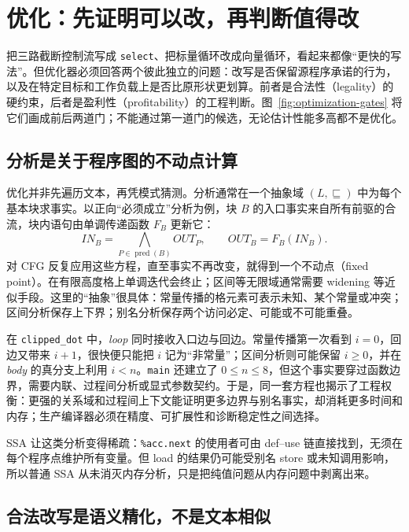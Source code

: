 \section{优化：先证明可以改，再判断值得改}
\label{sec:optimization}

把三路截断控制流写成 \texttt{select}、把标量循环改成向量循环，看起来都像“更快的写法”。但优化器必须回答两个彼此独立的问题：改写是否保留源程序承诺的行为，以及在特定目标和工作负载上是否比原形状更划算。前者是合法性（legality）的硬约束，后者是盈利性（profitability）的工程判断。图~\ref{fig:optimization-gates} 将它们画成前后两道门；不能通过第一道门的候选，无论估计性能多高都不是优化。



\subsection{分析是关于程序图的不动点计算}

优化并非先遍历文本，再凭模式猜测。分析通常在一个抽象域 \((L,\sqsubseteq)\) 中为每个基本块求事实。以正向“必须成立”分析为例，块 \(B\) 的入口事实来自所有前驱的合流，块内语句由单调传递函数 \(F_B\) 更新它：
\begin{equation}
  IN_B=\bigwedge_{P\in \operatorname{pred}(B)}OUT_P,
  \qquad OUT_B=F_B(IN_B).
  \label{eq:dataflow-fixed-point}
\end{equation}
对 CFG 反复应用这些方程，直至事实不再改变，就得到一个不动点（fixed point）。在有限高度格上单调迭代会终止；区间等无限域通常需要 widening 等近似手段。这里的“抽象”很具体：常量传播的格元素可表示未知、某个常量或冲突；区间分析保存上下界；别名分析保存两个访问必定、可能或不可能重叠。

在 \texttt{clipped\_dot} 中，\textit{loop} 同时接收入口边与回边。常量传播第一次看到 \(i=0\)，回边又带来 \(i+1\)，很快便只能把 \(i\) 记为“非常量”；区间分析则可能保留 \(i\ge0\)，并在 \textit{body} 的真分支上利用 \(i<n\)。\texttt{main} 还建立了 \(0\le n\le8\)，但这个事实要穿过函数边界，需要内联、过程间分析或显式参数契约。于是，同一套方程也揭示了工程权衡：更强的关系域和过程间上下文能证明更多边界与别名事实，却消耗更多时间和内存；生产编译器必须在精度、可扩展性和诊断稳定性之间选择。

SSA 让这类分析变得稀疏：\texttt{\%acc.next} 的使用者可由 def--use 链直接找到，无须在每个程序点维护所有变量。但 load 的结果仍可能受别名 store 或未知调用影响，所以普通 SSA 从未消灭内存分析，只是把纯值问题从内存问题中剥离出来。

\subsection{合法改写是语义精化，不是文本相似}

